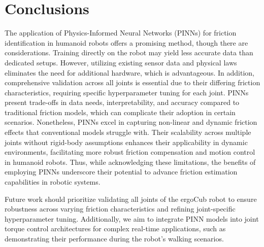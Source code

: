 \section{Conclusions}
\label{sec:conclusions}

The application of Physics-Informed Neural Networks (PINNs) for friction identification in humanoid robots offers a promising method, though there are considerations. Training directly on the robot may yield less accurate data than dedicated setups. However, utilizing existing sensor data and physical laws eliminates the need for additional hardware, which is advantageous. In addition, comprehensive validation across all joints is essential due to their differing friction characteristics, requiring specific hyperparameter tuning for each joint. PINNs present trade-offs in data needs, interpretability, and accuracy compared to traditional friction models, which can complicate their adoption in certain scenarios. Nonetheless, PINNs excel in capturing non-linear and dynamic friction effects that conventional models struggle with. Their scalability across multiple joints without rigid-body assumptions enhances their applicability in dynamic environments, facilitating more robust friction compensation and motion control in humanoid robots. Thus, while acknowledging these limitations, the benefits of employing PINNs underscore their potential to advance friction estimation capabilities in robotic systems.

Future work should prioritize validating all joints of the ergoCub robot to ensure robustness across varying friction characteristics and refining joint-specific hyperparameter tuning. Additionally, we aim to integrate PINN models into joint torque control architectures for complex real-time applications, such as demonstrating their performance during the robot's walking scenarios.
